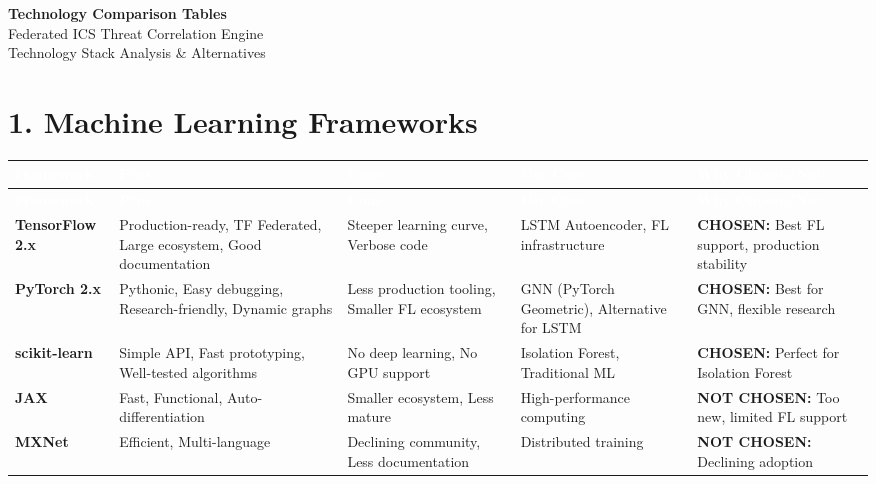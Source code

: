 \documentclass[12pt,a4paper,landscape]{article}
\begin{document}
\begin{center}
    {\Huge \textbf{Technology Comparison Tables}}\\[0.3cm]
    {\Large Federated ICS Threat Correlation Engine}\\[0.2cm]
    {\large Technology Stack Analysis \& Alternatives}\\[0.5cm]
\end{center}

\section*{1. Machine Learning Frameworks}

\begin{longtable}{|p{2.5cm}|p{3cm}|p{3cm}|p{3cm}|p{4cm}|}
\hline
\rowcolor{headercolor}
\textcolor{white}{\textbf{Framework}} & 
\textcolor{white}{\textbf{Pros}} & 
\textcolor{white}{\textbf{Cons}} & 
\textcolor{white}{\textbf{Use Case}} & 
\textcolor{white}{\textbf{Why Chosen/Not}} \\
\hline
\endfirsthead

\hline
\rowcolor{headercolor}
\textcolor{white}{\textbf{Framework}} & 
\textcolor{white}{\textbf{Pros}} & 
\textcolor{white}{\textbf{Cons}} & 
\textcolor{white}{\textbf{Use Case}} & 
\textcolor{white}{\textbf{Why Chosen/Not}} \\
\hline
\endhead

\rowcolor{rowcolor1}
\textbf{TensorFlow 2.x} & 
Production-ready, TF Federated, Large ecosystem, Good documentation & 
Steeper learning curve, Verbose code & 
LSTM Autoencoder, FL infrastructure & 
\textbf{CHOSEN:} Best FL support, production stability \\
\hline

\rowcolor{rowcolor2}
\textbf{PyTorch 2.x} & 
Pythonic, Easy debugging, Research-friendly, Dynamic graphs & 
Less production tooling, Smaller FL ecosystem & 
GNN (PyTorch Geometric), Alternative for LSTM & 
\textbf{CHOSEN:} Best for GNN, flexible research \\
\hline

\rowcolor{rowcolor1}
\textbf{scikit-learn} & 
Simple API, Fast prototyping, Well-tested algorithms & 
No deep learning, No GPU support & 
Isolation Forest, Traditional ML & 
\textbf{CHOSEN:} Perfect for Isolation Forest \\
\hline

\rowcolor{rowcolor2}
\textbf{JAX} & 
Fast, Functional, Auto-differentiation & 
Smaller ecosystem, Less mature & 
High-performance computing & 
\textbf{NOT CHOSEN:} Too new, limited FL support \\
\hline

\rowcolor{rowcolor1}
\textbf{MXNet} & 
Efficient, Multi-language & 
Declining community, Less documentation & 
Distributed training & 
\textbf{NOT CHOSEN:} Declining adoption \\
\hline
\end{longtable}
\end{document}
